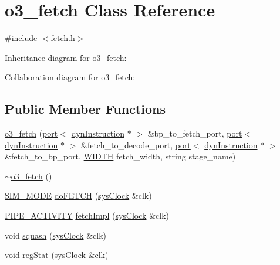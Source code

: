 \hypertarget{classo3__fetch}{
\section{o3\_\-fetch Class Reference}
\label{classo3__fetch}
}


{\ttfamily \#include $<$fetch.h$>$}



Inheritance diagram for o3\_\-fetch:


Collaboration diagram for o3\_\-fetch:
\subsection*{Public Member Functions}
\begin{DoxyCompactItemize}
\item 
\hyperlink{classo3__fetch_a891511bce60bdcd499b599da711d62e2}{o3\_\-fetch} (\hyperlink{classport}{port}$<$ \hyperlink{classdynInstruction}{dynInstruction} $\ast$ $>$ \&bp\_\-to\_\-fetch\_\-port, \hyperlink{classport}{port}$<$ \hyperlink{classdynInstruction}{dynInstruction} $\ast$ $>$ \&fetch\_\-to\_\-decode\_\-port, \hyperlink{classport}{port}$<$ \hyperlink{classdynInstruction}{dynInstruction} $\ast$ $>$ \&fetch\_\-to\_\-bp\_\-port, \hyperlink{global_2global_8h_a6fa2e24b8a418fa215e183264cbea3aa}{WIDTH} fetch\_\-width, string stage\_\-name)
\item 
\hyperlink{classo3__fetch_ab7a66f1ecf6c3a82af1d7f0a4dc6a819}{$\sim$o3\_\-fetch} ()
\item 
\hyperlink{unit_2stage_8h_ac68af0001af4b7049b2435ded74c4e5e}{SIM\_\-MODE} \hyperlink{classo3__fetch_a504eff13df91f086a8db237a6b98c9e7}{doFETCH} (\hyperlink{classsysClock}{sysClock} \&clk)
\item 
\hyperlink{unit_2stage_8h_ab00e4188e8b8974fecb1dfd12764cbb1}{PIPE\_\-ACTIVITY} \hyperlink{classo3__fetch_a87124ad19a418d931aff507eaacfb60f}{fetchImpl} (\hyperlink{classsysClock}{sysClock} \&clk)
\item 
void \hyperlink{classo3__fetch_a90a02763ec511000d70d4c2a5d2774bf}{squash} (\hyperlink{classsysClock}{sysClock} \&clk)
\item 
void \hyperlink{classo3__fetch_af499f0a4a59dbb59dc8de189058032a5}{regStat} (\hyperlink{classsysClock}{sysClock} \&clk)
\end{DoxyCompactItemize}


